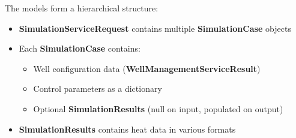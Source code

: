 \bigskip

The models form a hierarchical structure:

\begin{itemize}
	\item \textbf{SimulationServiceRequest} contains multiple \textbf{SimulationCase} objects
	\item Each \textbf{SimulationCase} contains:
	\begin{itemize}
		\item Well configuration data (\textbf{WellManagementServiceResult})
		\item Control parameters as a dictionary
		\item Optional \textbf{SimulationResults} (null on input, populated on output)
	\end{itemize}
	\item \textbf{SimulationResults} contains heat data in various formats
\end{itemize}




